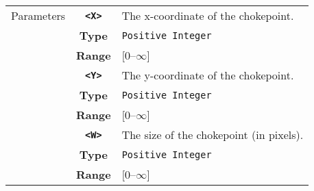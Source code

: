  \begin{tabularx}{\textwidth}{l | c | p{8cm}|}
 \cline{2-3}
 Parameters & \textbf{\verb|<X>|} & The x-coordinate of the chokepoint.\\
            & \textbf{Type} & \verb|Positive Integer| \\
            & \textbf{Range} & [0--$\infty$] \\
            \cline{2-3}
            & \textbf{\verb|<Y>|} & The y-coordinate of the chokepoint.\\
            & \textbf{Type} & \verb|Positive Integer| \\
            & \textbf{Range} & [0--$\infty$] \\
            \cline{2-3}
            & \textbf{\verb|<W>|} & The size of the chokepoint (in pixels).\\
            & \textbf{Type} & \verb|Positive Integer| \\
            & \textbf{Range} & [0--$\infty$] \\
            \cline{2-3}
\end{tabularx}\\

